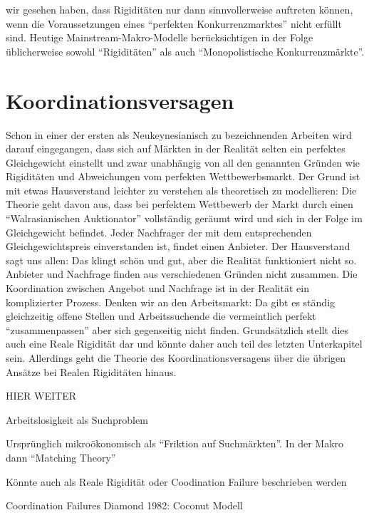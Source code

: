 wir gesehen haben, dass Rigiditäten nur dann sinnvollerweise auftreten können, wenn die Voraussetzungen eines "`perfekten Konkurrenzmarktes"' nicht erfüllt sind. Heutige Mainstream-Makro-Modelle berücksichtigen in der Folge üblicherweise sowohl "`Rigiditäten"' als auch "`Monopolistische Konkurrenzmärkte"'.





\section{Koordinationsversagen}
\label{Suchtheorie}
Schon in einer der ersten als Neukeynesianisch zu bezeichnenden Arbeiten wird darauf eingegangen, dass sich auf Märkten in der Realität selten ein perfektes Gleichgewicht einstellt \parencite[S. 683]{Phelps1968} und zwar unabhängig von all den genannten Gründen wie Rigiditäten und Abweichungen vom perfekten Wettbewerbsmarkt. Der Grund ist mit etwas Hausverstand leichter zu verstehen als theoretisch zu modellieren: Die Theorie geht davon aus, dass bei perfektem Wettbewerb der Markt durch einen "`Walrasianischen Auktionator"' vollständig geräumt wird und sich in der Folge im Gleichgewicht befindet. Jeder Nachfrager der mit dem entsprechenden Gleichgewichtspreis einverstanden ist, findet einen Anbieter. Der Hausverstand sagt uns allen: Das klingt schön und gut, aber die Realität funktioniert nicht so. Anbieter und Nachfrage finden aus verschiedenen Gründen nicht zusammen. Die Koordination zwischen Angebot und Nachfrage ist in der Realität ein komplizierter Prozess. Denken wir an den Arbeitsmarkt: Da gibt es ständig gleichzeitig offene Stellen und Arbeitssuchende die vermeintlich perfekt "`zusammenpassen"' aber sich gegenseitig nicht finden.
Grundsätzlich stellt dies auch eine Reale Rigidität dar \parencite[S. 11]{RomerDavid1993} und könnte daher auch teil des letzten Unterkapitel sein. Allerdings geht die Theorie des Koordinationsversagens über die übrigen Ansätze bei Realen Rigiditäten hinaus. 



HIER WEITER

Arbeitslosigkeit als Suchproblem



Ursprünglich mikroökonomisch als "`Friktion auf Suchmärkten"'. In der Makro dann "`Matching Theory"'

Könnte auch als Reale Rigidität oder Coodination Failure beschrieben werden

Coordination Failures
Diamond 1982: Coconut Modell

